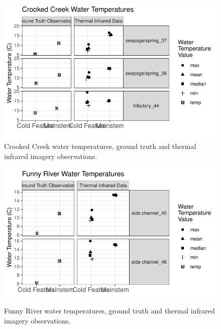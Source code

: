 \documentclass[
  letterpaper,
  DIV=11,
  numbers=noendperiod]{scrreprt}
\begin{document}
\begin{figure}

{\centering \includegraphics{./thermal_imagery_data_files/figure-pdf/fig-gt-tir-obs-crooked-1.pdf}

}

\caption{\label{fig-gt-tir-obs-crooked}Crooked Creek water temperatures,
ground truth and thermal infrared imagery observations.}

\end{figure}

\begin{figure}

{\centering \includegraphics{./thermal_imagery_data_files/figure-pdf/fig-gt-tir-obs-funny-1.pdf}

}

\caption{\label{fig-gt-tir-obs-funny}Funny River water temperatures,
ground truth and thermal infrared imagery observations.}

\end{figure}
\end{document}
